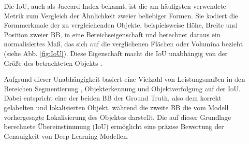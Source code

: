 Die \acrfull{IoU}, auch als Jaccard-Index bekannt, ist die am häufigsten verwendete Metrik zum Vergleich der Ähnlichkeit zweier beliebiger Formen. Sie kodiert die Formmerkmale der zu vergleichenden Objekte, beispielsweise Höhe, Breite und Position zweier \acrshort{BB}, in eine Bereichseigenschaft und berechnet daraus ein normalisiertes Maß, das sich auf die verglichenen Flächen oder Volumina bezieht (siehe Abb. \ref{fig:IoU}). Diese Eigenschaft macht die \acrshort{IoU} unabhängig von der Größe des betrachteten Objekts \cite{Rezatofighi2019}.

Aufgrund dieser Unabhängigkeit basiert eine Vielzahl von Leistungsmaßen in den Bereichen Segmentierung \cite{Ramirez2019,cordts2016,Zhou2017,lin2015}, Objekterkennung \cite{lin2015,Everingham2010} und Objektverfolgung \cite{Kristan2016,lealtaixé2015} auf der \acrshort{IoU}. Dabei entspricht eine der beiden \acrshort{BB} der Ground Truth, also dem korrekt gelabelten und lokalisierten Objekt, während die zweite \acrshort{BB} die vom Modell vorhergesagte Lokalisierung des Objektes darstellt. Die auf dieser Grundlage berechnete Übereinstimmung (\acrshort{IoU}) ermöglicht eine präzise Bewertung der Genauigkeit von Deep-Learning-Modellen.







